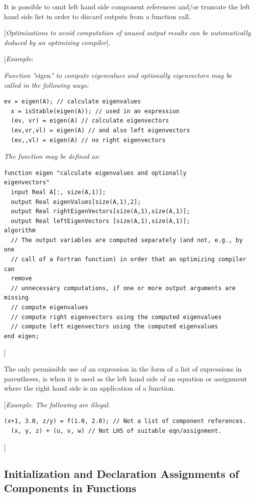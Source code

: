 \documentclass[10pt,a4paper]{report}
\def\doublelabel#1{\label{#1}\hypertarget{#1}{}}
\begin{document}
It is possible to omit left hand side component references and/or
truncate the left hand side list in order to discard outputs from a
function call.

{[}\emph{Optimizations to avoid computation of unused output results can
be automatically deduced by an optimizing compiler}{]}.

{[}\emph{Example}:

\emph{Function "}eigen\emph{" to compute eigenvalues and optionally
eigenvectors may be called in the following ways:}

\begin{lstlisting}[language=modelica]
  ev = eigen(A); // calculate eigenvalues
  x = isStable(eigen(A)); // used in an expression
  (ev, vr) = eigen(A) // calculate eigenvectors
  (ev,vr,vl) = eigen(A) // and also left eigenvectors
  (ev,,vl) = eigen(A) // no right eigenvectors
\end{lstlisting}
\emph{The function may be defined as:}

\begin{lstlisting}[language=modelica]
function eigen "calculate eigenvalues and optionally
eigenvectors"
  input Real A[:, size(A,1)];
  output Real eigenValues[size(A,1),2];
  output Real rightEigenVectors[size(A,1),size(A,1)];
  output Real leftEigenVectors [size(A,1),size(A,1)];
algorithm
  // The output variables are computed separately (and not, e.g., by one
  // call of a Fortran function) in order that an optimizing compiler can
  remove
  // unnecessary computations, if one or more output arguments are missing
  // compute eigenvalues
  // compute right eigenvectors using the computed eigenvalues
  // compute left eigenvectors using the computed eigenvalues
end eigen;
\end{lstlisting}
{]}

The only permissible use of an expression in the form of a list of
expressions in parentheses, is when it is used as the left hand side of
an equation or assignment where the right hand side is an application of
a function.

{[}\emph{Example}. \emph{The following are illegal}:

\begin{lstlisting}[language=modelica]
  (x+1, 3.0, z/y) = f(1.0, 2.0); // Not a list of component references.
  (x, y, z) + (u, v, w) // Not LHS of suitable eqn/assignment.
\end{lstlisting}
{]}

\subsection{Initialization and Declaration Assignments of Components in Functions}\doublelabel{initialization-and-declaration-assignments-of-components-in-functions}
\end{document}

